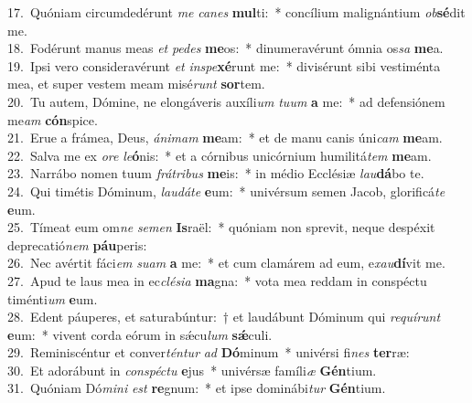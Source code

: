 {17.~}Quóniam circumdedérunt \textit{me} \textit{ca}\textit{nes} \textbf{mul}ti:~* concílium malignántium \textit{ob}\textbf{sé}dit me.\\
{18.~}Fodérunt manus meas \textit{et} \textit{pe}\textit{des} \textbf{me}os:~* dinumeravérunt ómnia os\textit{sa} \textbf{me}a.\\
{19.~}Ipsi vero consideravérunt \textit{et} \textit{in}\textit{spe}\textbf{xé}runt me:~* divisérunt sibi vestiménta mea, et super vestem meam misé\textit{runt} \textbf{sor}tem.\\
{20.~}Tu autem, Dómine, ne elongáveris auxíli\textit{um} \textit{tu}\textit{um} \textbf{a} me:~* ad defensiónem me\textit{am} \textbf{cón}spice.\\
{21.~}Erue a frámea, Deus, \textit{á}\textit{ni}\textit{mam} \textbf{me}am:~* et de manu canis úni\textit{cam} \textbf{me}am.\\
{22.~}Salva me ex \textit{o}\textit{re} \textit{le}\textbf{ó}nis:~* et a córnibus unicórnium humilitá\textit{tem} \textbf{me}am.\\
{23.~}Narrábo nomen tuum \textit{frá}\textit{tri}\textit{bus} \textbf{me}is:~* in médio Ecclésiæ \textit{lau}\textbf{dá}bo te.\\
{24.~}Qui timétis Dóminum, \textit{lau}\textit{dá}\textit{te} \textbf{e}um:~* univérsum semen Jacob, glorificá\textit{te} \textbf{e}um.\\
{25.~}Tímeat eum om\textit{ne} \textit{se}\textit{men} \textbf{Is}raël:~* quóniam non sprevit, neque despéxit deprecatió\textit{nem} \textbf{páu}peris:\\
{26.~}Nec avértit fáci\textit{em} \textit{su}\textit{am} \textbf{a} me:~* et cum clamárem ad eum, e\textit{xau}\textbf{dí}vit me.\\
{27.~}Apud te laus mea in ec\textit{clé}\textit{si}\textit{a} \textbf{ma}gna:~* vota mea reddam in conspéctu timénti\textit{um} \textbf{e}um.\\
{28.~}Edent páuperes, et saturabúntur:~† et laudábunt Dóminum qui \textit{re}\textit{quí}\textit{runt} \textbf{e}um:~* vivent corda eórum in sǽcu\textit{lum} \textbf{sǽ}culi.\\
{29.~}Reminiscéntur et conver\textit{tén}\textit{tur} \textit{ad} \textbf{Dó}minum~* univérsi fi\textit{nes} \textbf{ter}ræ:\\
{30.~}Et adorábunt in \textit{con}\textit{spé}\textit{ctu} \textbf{e}jus~* univérsæ famíli\textit{æ} \textbf{Gén}tium.\\
{31.~}Quóniam Dó\textit{mi}\textit{ni} \textit{est} \textbf{re}gnum:~* et ipse dominábi\textit{tur} \textbf{Gén}tium.\\
